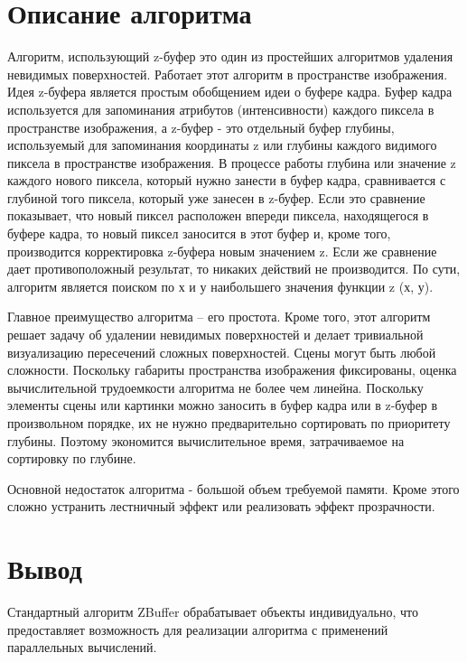 \section{Описание алгоритма}
Алгоритм, использующий z-буфер это один из простейших алгоритмов удаления невидимых поверхностей. Работает этот алгоритм в пространстве изображения. Идея z-буфера является простым обобщением идеи о буфере кадра. Буфер кадра используется для запоминания атрибутов (интенсивности) каждого пиксела в пространстве изображения, а z-буфер - это отдельный буфер глубины, используемый для запоминания координаты z или глубины каждого видимого пиксела в пространстве изображения. В процессе работы глубина или значение z каждого нового пиксела, который нужно занести в буфер кадра, сравнивается с глубиной того пиксела, который уже занесен в z-буфер. Если это сравнение показывает, что новый пиксел расположен впереди пиксела, находящегося в буфере кадра, то новый пиксел заносится в этот буфер и, кроме того, производится корректировка z-буфера новым значением z. Если же сравнение дает противоположный результат, то никаких действий не производится. По сути, алгоритм является поиском по х и у наибольшего значения функции z (х, у).

Главное преимущество алгоритма – его простота. Кроме того, этот алгоритм решает задачу об удалении невидимых поверхностей и делает тривиальной визуализацию пересечений сложных поверхностей. Сцены могут быть любой сложности. Поскольку габариты пространства изображения фиксированы, оценка вычислительной трудоемкости алгоритма не более чем линейна. Поскольку элементы сцены или картинки можно заносить в буфер кадра или в z-буфер в произвольном порядке, их не нужно предварительно сортировать по приоритету глубины. Поэтому экономится вычислительное время, затрачиваемое на сортировку по глубине.

Основной недостаток алгоритма - большой объем требуемой памяти. Кроме этого сложно устранить лестничный эффект или реализовать эффект прозрачности.

\section{Вывод}

Стандартный алгоритм ZBuffer обрабатывает объекты индивидуально, что предоставляет возможность для реализации алгоритма с применений параллельных вычислений.

